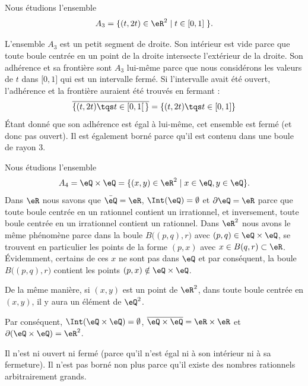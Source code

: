 \begin{example}
	Nous étudions l'ensemble
	\begin{equation}
		A_3 = \{ ( t , 2t ) \in \eR^2 \; | \; t \in [0, 1] \; \}.
	\end{equation}

	L'ensemble \( A_3\) est un petit segment de droite. Son intérieur est vide parce que toute boule centrée en un point de la droite intersecte l'extérieur de la droite. Son adhérence et sa frontière sont \( A_3\) lui-même parce que nous considérons les valeurs de \( t\) dans \( \mathopen[ 0 , 1 \mathclose]\) qui est un intervalle fermé. Si l'intervalle avait été ouvert, l'adhérence et la frontière auraient été trouvés en fermant :
	\begin{equation}
		\overline{ \{ (t,2t)\tqs t\in\mathopen[ 0 , 1 [\, \}}=\{ (t,2t)\tqs t\in\mathopen[ 0 , 1 ] \}
	\end{equation}
	Étant donné que son adhérence est égal à lui-même, cet ensemble est fermé (et donc pas ouvert). Il est également borné parce qu'il est contenu dans une boule de rayon \( 3\).
\end{example}

\begin{example}
	Nous étudions l'ensemble
	\begin{equation}
		A_4 = \eQ \times \eQ = \{ (x, y ) \in \eR^2 \; | \; x \in \eQ , y \in \eQ \}.
	\end{equation}
	Dans \( \eR\) nous savons que \( \bar\eQ=\eR\), \( \Int(\eQ)=\emptyset\) et \( \partial\eQ=\eR\) parce que toute boule centrée en un rationnel contient un irrationnel, et inversement, toute boule centrée en un irrationnel contient un rationnel. Dans \( \eR^2\) nous avons le même phénomène parce dans la boule \( B\big( (p,q),r \big)\) avec \( (p,q)\in\eQ\times\eQ\), se trouvent en particulier les points de la forme \( (p,x)\) avec \( x\in B(q,r)\subset\eR\). Évidemment, certains de ces \( x\) ne sont pas dans \( \eQ\) et par conséquent, la boule \( B\big( (p,q),r \big)\) contient les points \( (p,x)\notin\eQ\times\eQ\).

	De la même manière, si \( (x,y)\) est un point de \( \eR^2\), dans toute boule centrée en \( (x,y)\), il y aura un élément de \( \eQ^2\).

	Par conséquent, \( \Int(\eQ\times\eQ)=\emptyset\), \( \overline{ \eQ\times\eQ }=\eR\times\eR\) et \( \partial(\eQ\times\eQ)=\eR^2\).

	Il n'est ni ouvert ni fermé (parce qu'il n'est égal ni à son intérieur ni à sa fermeture). Il n'est pas borné non plus parce qu'il existe des nombres rationnels arbitrairement grands.
\end{example}


